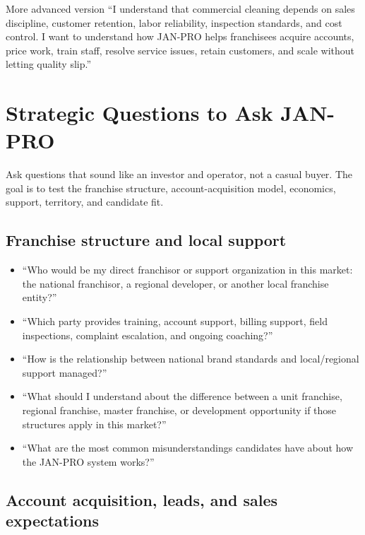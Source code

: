 \documentclass[11pt]{article}
\newcommand{\janpro}{JAN-PRO}
\begin{document}
\begin{scriptbox}{More advanced version}
``I understand that commercial cleaning depends on sales discipline, customer retention, labor reliability, inspection standards, and cost control. I want to understand how \janpro{} helps franchisees acquire accounts, price work, train staff, resolve service issues, retain customers, and scale without letting quality slip.''
\end{scriptbox}

\section{Strategic Questions to Ask \janpro{}}

Ask questions that sound like an investor and operator, not a casual buyer. The goal is to test the franchise structure, account-acquisition model, economics, support, territory, and candidate fit.

\subsection{Franchise structure and local support}

\begin{itemize}
  \item ``Who would be my direct franchisor or support organization in this market: the national franchisor, a regional developer, or another local franchise entity?''
  \item ``Which party provides training, account support, billing support, field inspections, complaint escalation, and ongoing coaching?''
  \item ``How is the relationship between national brand standards and local/regional support managed?''
  \item ``What should I understand about the difference between a unit franchise, regional franchise, master franchise, or development opportunity if those structures apply in this market?''
  \item ``What are the most common misunderstandings candidates have about how the \janpro{} system works?''
\end{itemize}

\subsection{Account acquisition, leads, and sales expectations}
\end{document}
